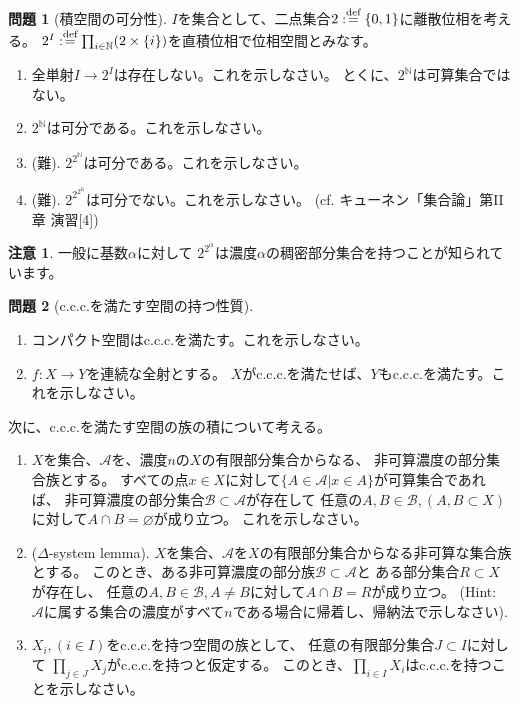 \documentclass[uplatex]{jsarticle}
\theoremstyle{definition}
\newtheorem{prob}[prob]{問題}
\newtheorem*{rem*}{注意}
\renewcommand{\emptyset}{\varnothing}
\newcommand{\dfn}{:\overset{\mbox{{\scriptsize def}}}{=}}
\newcommand{\N}{\mathbb{N}}
\newcommand{\mcA}{\mathcal{A}}
\newcommand{\mcB}{\mathcal{B}}
\begin{document}
\begin{prob}[積空間の可分性]\label{power separable}
  \(I\)を集合として、二点集合\(2\dfn \{0,1\}\)に離散位相を考える。
  \(2^I\dfn \prod_{i\in \N}(2\times \{i\})\)を直積位相で位相空間とみなす。
  \begin{enumerate}
    \item
    全単射\(I\to 2^I\)は存在しない。これを示しなさい。
    とくに、\(2^{\N}\)は可算集合ではない。
    \item
    \(2^{\N}\)は可分である。これを示しなさい。
    \item (難).
    \(2^{2^{\N}}\)は可分である。これを示しなさい。
    \item (難).
    \(2^{2^{2^{\N}}}\)は可分でない。これを示しなさい。
    (cf. キューネン「集合論」第II章 演習[4])
  \end{enumerate}
\end{prob}



\begin{rem*}
  一般に基数\(\alpha\)に対して
  \(2^{2^{\alpha}}\)は濃度\(\alpha\)の稠密部分集合を持つことが知られています。
\end{rem*}



\begin{prob}[c.c.c.を満たす空間の持つ性質]\label{prod c.c.c.}
  \
  \begin{enumerate}
    \item
    コンパクト空間はc.c.c.を満たす。これを示しなさい。
    \item \(f:X\to Y\)を連続な全射とする。
    \(X\)がc.c.c.を満たせば、\(Y\)もc.c.c.を満たす。これを示しなさい。
  \end{enumerate}
  次に、c.c.c.を満たす空間の族の積について考える。
  \begin{enumerate}[start=3]
    \item
    \(X\)を集合、\(\mcA\)を、濃度\(n\)の\(X\)の有限部分集合からなる、
    非可算濃度の部分集合族とする。
    すべての点\(x\in X\)に対して\(\{A\in \mcA | x\in A\}\)が可算集合であれば、
    非可算濃度の部分集合\(\mcB\subset \mcA\)が存在して
    任意の\(A,B\in \mcB, (A,B\subset X)\)に対して\(A\cap B = \emptyset\)が成り立つ。
    これを示しなさい。
    \item (\(\Delta\)-system lemma).
    \(X\)を集合、\(\mcA\)を\(X\)の有限部分集合からなる非可算な集合族とする。
    このとき、ある非可算濃度の部分族\(\mcB\subset \mcA\)と
    ある部分集合\(R\subset X\)が存在し、
    任意の\(A,B\in \mcB, A\neq B\)に対して\(A\cap B = R\)が成り立つ。
    (Hint: \(\mcA\)に属する集合の濃度がすべて\(n\)である場合に帰着し、帰納法で示しなさい).
    \item
    \(X_i, (i\in I)\)をc.c.c.を持つ空間の族として、
    任意の有限部分集合\(J\subset I\)に対して
    \(\prod_{j\in J}X_j\)がc.c.c.を持つと仮定する。
    このとき、\(\prod_{i\in I}X_i\)はc.c.c.を持つことを示しなさい。
  \end{enumerate}
\end{prob}
\end{document}
